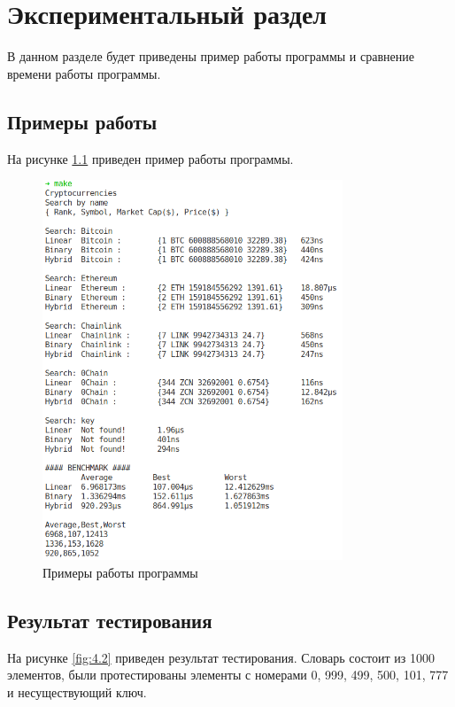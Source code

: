\chapter{Экспериментальный раздел}
\label{cha:research}

В данном разделе будет приведены пример работы программы и сравнение времени работы программы.

\section{Примеры работы}
На рисунке \ref{fig:4.1} приведен пример работы программы.

\begin{figure}[h]
    \centering
    \includegraphics[width=0.8\textwidth]{7/inc/e1.png}
    \caption{Примеры работы программы}
    \label{fig:4.1}
\end{figure}

\section{Результат тестирования}

На рисунке \ref{fig:4.2} приведен результат тестирования.
Словарь состоит из 1000 элементов, были протестированы элементы с номерами 0, 999, 499, 500, 101, 777 и несуществующий ключ.


